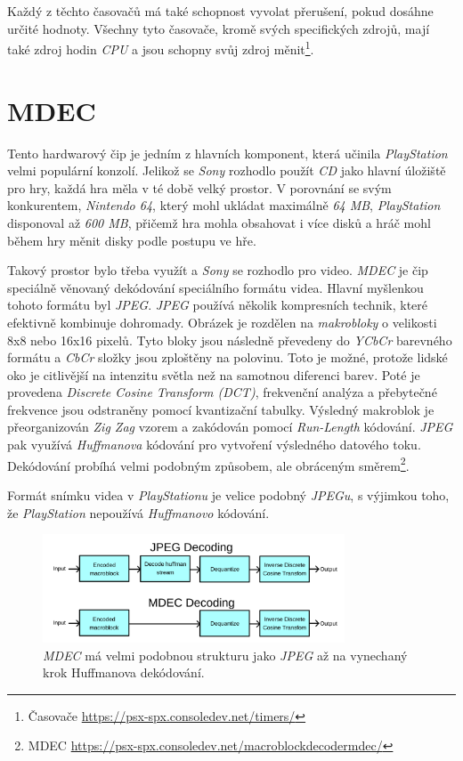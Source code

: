 Každý z těchto časovačů má také schopnost vyvolat přerušení, pokud dosáhne určité hodnoty. 
Všechny tyto časovače, kromě svých specifických zdrojů, mají také zdroj hodin \textit{CPU} a jsou schopny svůj zdroj měnit\footnote{Časovače\cite{PSXSpec} \url{https://psx-spx.consoledev.net/timers/}}.

\section{MDEC}

Tento hardwarový čip je jedním z hlavních komponent, která učinila \textit{PlayStation} velmi populární konzolí.
Jelikož se \textit{Sony} rozhodlo použít \textit{CD} jako hlavní úložiště pro hry, každá hra měla v té době
velký prostor. V porovnání se svým konkurentem, \textit{Nintendo 64}, který mohl ukládat maximálně \textit{64 MB},
\textit{PlayStation} disponoval až \textit{600 MB}, přičemž hra mohla obsahovat i více disků a hráč mohl během hry
měnit disky podle postupu ve hře.

Takový prostor bylo třeba využít a \textit{Sony} se rozhodlo pro video. \textit{MDEC} je čip speciálně věnovaný
dekódování speciálního formátu videa. Hlavní myšlenkou tohoto formátu byl \textit{JPEG}. \textit{JPEG} používá
několik kompresních technik, které efektivně kombinuje dohromady. Obrázek je rozdělen na \textit{makrobloky} o velikosti
8x8 nebo 16x16 pixelů. Tyto bloky jsou následně převedeny do \textit{YCbCr} barevného formátu a \textit{CbCr} složky jsou
zploštěny na polovinu. Toto je možné, protože lidské oko je citlivější na intenzitu světla než na samotnou diferenci barev.
Poté je provedena \textit{Discrete Cosine Transform (DCT)}, frekvenční analýza a přebytečné frekvence jsou odstraněny
pomocí kvantizační tabulky. Výsledný makroblok je přeorganizován \textit{Zig Zag} vzorem a zakódován pomocí \textit{Run-Length}
kódování. \textit{JPEG} pak využívá \textit{Huffmanova} kódování pro vytvoření výsledného datového toku.
Dekódování probíhá velmi podobným způsobem, ale obráceným směrem\footnote{MDEC\cite{PSXSpec} \url{https://psx-spx.consoledev.net/macroblockdecodermdec/}}.

Formát snímku videa v \textit{PlayStationu} je velice podobný \textit{JPEGu}, s výjimkou toho, že \textit{PlayStation} nepoužívá \textit{Huffmanovo} kódování.

\begin{figure}[hbt]
	\centering
	\includegraphics[width=0.8\textwidth]{obrazky-figures/mdec-decoding.png}
	\caption{\textit{MDEC} má velmi podobnou strukturu jako \textit{JPEG} až na vynechaný krok Huffmanova dekódování.}
	\label{mdec-decoding}
\end{figure}

